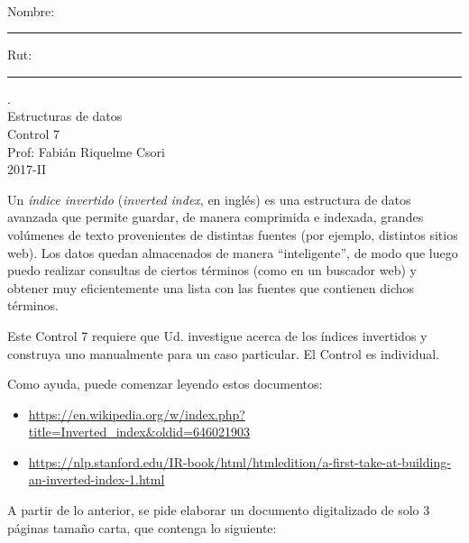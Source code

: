 \documentclass[letter,12pt,oneside]{book}
\theoremstyle{definition}
\begin{document}

\begin{center}
$~$
\end{center}

\noindent
Nombre: \rule{.6\textwidth}{.5pt} Rut: \rule{.24\textwidth}{.5pt}

\begin{center}
 {\Large
  {\color{white}.}\\
  Estructuras de datos\\[1ex]
  Control 7}\\[1.2ex]
  Prof: Fabián Riquelme Csori\\
  2017-II
\end{center}

  Un {\em índice invertido} ({\em inverted index}, en inglés) es una estructura de datos avanzada que permite guardar, de manera comprimida e indexada, grandes volúmenes de texto provenientes de distintas fuentes (por ejemplo, distintos sitios web). Los datos quedan almacenados de manera ``inteligente'', de modo que luego puedo realizar consultas de ciertos términos (como en un buscador web) y obtener muy eficientemente una lista con las fuentes que contienen dichos términos.

  Este Control 7 requiere que Ud. investigue acerca de los índices invertidos y construya uno manualmente para un caso particular. El Control es individual.
  
  Como ayuda, puede comenzar leyendo estos documentos:
  \begin{itemize}
      \item {\scriptsize \url{https://en.wikipedia.org/w/index.php?title=Inverted_index&oldid=646021903}}\\[-5ex]
      \item {\scriptsize \url{https://nlp.stanford.edu/IR-book/html/htmledition/a-first-take-at-building-an-inverted-index-1.html}}
  \end{itemize}

    A partir de lo anterior, se pide elaborar un documento digitalizado de solo 3 páginas tamaño carta, que contenga lo siguiente:
\end{document}
